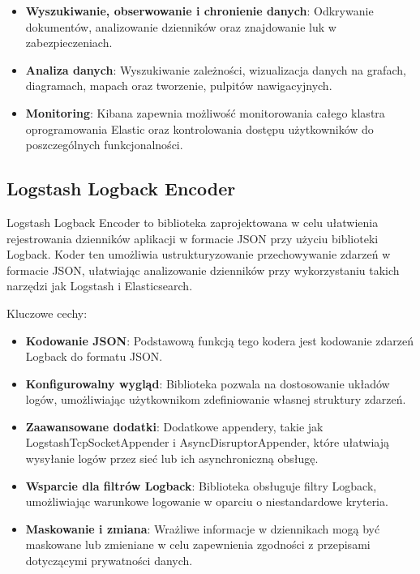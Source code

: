 \begin{itemize}
    \item \textbf{Wyszukiwanie, obserwowanie i chronienie danych}: Odkrywanie dokumentów,  analizowanie dzienników oraz znajdowanie luk w zabezpieczeniach\cite{kibanaOverview}.
    \item \textbf{Analiza danych}: Wyszukiwanie zależności, wizualizacja danych na grafach, diagramach, mapach oraz tworzenie, pulpitów nawigacyjnych\cite{kibanaOverview}.
    \item \textbf{Monitoring}: Kibana zapewnia możliwość monitorowania całego klastra oprogramowania Elastic oraz kontrolowania dostępu użytkowników do poszczególnych funkcjonalności\cite{kibanaOverview}.
\end{itemize}

\subsection{Logstash Logback Encoder}

Logstash Logback Encoder to biblioteka zaprojektowana w celu ułatwienia rejestrowania dzienników aplikacji w formacie JSON przy użyciu biblioteki Logback. Koder ten umożliwia ustrukturyzowanie przechowywanie zdarzeń w formacie JSON, ułatwiając analizowanie dzienników przy wykorzystaniu takich narzędzi jak Logstash i Elasticsearch\cite{logstashLogbackEncoderOverview}. 

Kluczowe cechy:

\begin{itemize}
    \item \textbf{Kodowanie JSON}: Podstawową funkcją tego kodera jest kodowanie zdarzeń Logback do formatu JSON\cite{logstashLogbackEncoderOverview}.
    \item \textbf{Konfigurowalny wygląd}: Biblioteka pozwala na dostosowanie układów logów, umożliwiając użytkownikom zdefiniowanie własnej struktury zdarzeń\cite{logstashLogbackEncoderOverview}.
    \item \textbf{Zaawansowane dodatki}: Dodatkowe appendery, takie jak LogstashTcpSocketAppender i AsyncDisruptorAppender, które ułatwiają wysyłanie logów przez sieć lub ich asynchroniczną obsługę\cite{logstashLogbackEncoderOverview}.
    \item \textbf{Wsparcie dla filtrów Logback}: Biblioteka obsługuje filtry Logback, umożliwiając warunkowe logowanie w oparciu o niestandardowe kryteria\cite{logstashLogbackEncoderOverview}.
    \item \textbf{Maskowanie i zmiana}: Wrażliwe informacje w dziennikach mogą być maskowane lub zmieniane w celu zapewnienia zgodności z przepisami dotyczącymi prywatności danych\cite{logstashLogbackEncoderOverview}.
\end{itemize}

